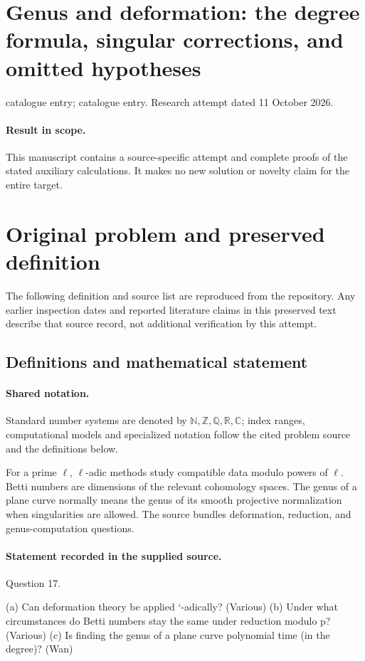 \documentclass[11pt]{article}
\begin{document}
\section*{Genus and deformation: the degree formula, singular corrections, and omitted hypotheses}
\noindent catalogue entry; catalogue entry. Research attempt dated 11 October 2026.
\paragraph{Result in scope.}This manuscript contains a source-specific attempt and complete proofs of the stated auxiliary calculations. It makes no new solution or novelty claim for the entire target.
\section{Original problem and preserved definition}
The following definition and source list are reproduced from the repository. Any earlier inspection dates and reported literature claims in this preserved text describe that source record, not additional verification by this attempt.
\subsection{Definitions and mathematical statement}

\paragraph{Shared notation.}Standard number systems are denoted by $\mathbb N,\mathbb Z,\mathbb Q,\mathbb R,\mathbb C$; index ranges, computational models and specialized notation follow the cited problem source and the definitions below.


For a prime $\ell$, $\ell$-adic methods study compatible data modulo powers of $\ell$. Betti numbers are dimensions of the relevant cohomology spaces. The genus of a plane curve normally means the genus of its smooth projective normalization when singularities are allowed. The source bundles deformation, reduction, and genus-computation questions.
\paragraph{Statement recorded in the supplied source.}
Question 17.

(a) Can deformation theory be applied `-adically? (Various) (b) Under what circumstances do Betti numbers stay the same under reduction modulo p?(Various) (c) Is finding the genus of a plane curve polynomial time (in the degree)? (Wan)
\end{document}
